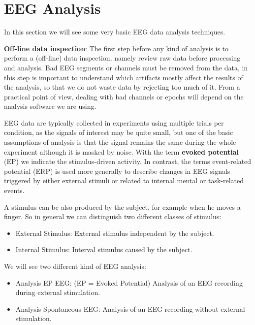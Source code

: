 \documentclass[10pt, letterpaper]{report}
\begin{document}
\section{EEG Analysis}\label{EEGAnalysis}
In this section we will see some very basic EEG data analysis techniques.\bigskip

\textbf{Off-line data inspection}:
The first step before any kind of analysis is to perform a (off-line) data inspection, namely review
raw data before processing and analysis. Bad EEG segments or channels must be removed from the
data, in this step is important to understand which artifacts mostly affect the results of the analysis,
so that we do not waste data by rejecting too much of it. From a practical point of view, dealing with
bad channels or epochs will depend on the analysis software we are using.\bigskip

EEG data are typically collected in experiments using multiple trials per condition, as the signals of
interest may be quite small, but one of the basic assumptions of analysis is that the signal remains
the same during the whole experiment although it is masked by noise.
With the term \textbf{evoked potential} (EP) we indicate the stimulus-driven activity. In contrast, the terms
event-related potential (ERP) is used more generally to describe changes in EEG signals triggered by
either external stimuli or related to internal mental or task-related events.
\begin{boxobservation}{}{}
     A stimulus can be also produced by the subject, for example when he moves a finger. So in
general we can distinguish two different classes of stimulus:\begin{itemize}
     \item External Stimulus: External stimulus independent by the subject.
  \item Internal Stimulus: Interval stimulus caused by the subject.
\end{itemize}
\end{boxobservation}
\noindent We will see two different kind of EEG analysis:\begin{itemize}
     \item Analysis EP EEG: (EP = Evoked Potential) Analysis of an EEG recording during external
stimulation.
 \item  Analysis Spontaneous EEG: Analysis of an EEG recording without external stimulation.
\end{itemize}
\end{document}
